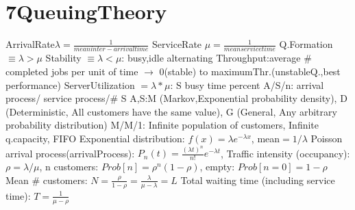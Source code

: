 \section{7QueuingTheory}
ArrivalRate$\lambda=\frac{1}{mean inter-arrival time}$
\textbar
ServiceRate $\mu=\frac{1}{mean service time}$
\textbar
Q.Formation $\equiv \lambda > \mu$
\textbar
Stability $\equiv \lambda < \mu$: busy,idle alternating
\textbar
Throughput:average \# completed jobs per unit of time $\rightarrow$ 0(stable) to maximumThr.(unstableQ.,best performance) 
\textbar
ServerUtilization $= \lambda * \mu$: S busy time percent
\textbar
A/S/n: arrival process/ service process/\# S
\textbar A,S:M (Markov,Exponential probability density),
D (Deterministic, All customers have the same value),
G (General, Any arbitrary probability distribution)
\textbar
M/M/1: Infinite population of customers, Infinite q.capacity, FIFO
\textbar
Exponential distribution: $f(x)=\lambda e^{-\lambda x}$, mean$= 1/\lambda$
\textbar
Poisson arrival process(arrivalProcess): $P_n(t) = \frac{(\lambda t)^n}{n!}e^{-\lambda t}$,
\textbar
Traffic intensity (occupancy): $\rho = \lambda/\mu$, n customers: $Prob[n] =\rho^n(1-\rho)$, empty: $Prob[n=0]=1-\rho$
\textbar
Mean \# customers: $N = \frac{\rho}{1-\rho} = \frac{\lambda}{\mu - \lambda} = L$
\textbar
Total waiting time (including service time): $T=\frac{1}{\mu - \rho}$